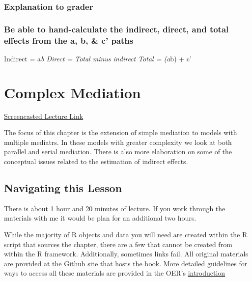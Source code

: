 \documentclass[
  11pt,
]{book}
\begin{document}
\hypertarget{explanation-to-grader}{%
\subsection*{Explanation to grader}\label{explanation-to-grader}}


\hypertarget{be-able-to-hand-calculate-the-indirect-direct-and-total-effects-from-the-a-b-c-paths}{%
\subsection*{Be able to hand-calculate the indirect, direct, and total effects from the a, b, \& c' paths}\label{be-able-to-hand-calculate-the-indirect-direct-and-total-effects-from-the-a-b-c-paths}}


Indirect = a\emph{b Direct = Total minus indirect Total = (a}b) + c'

\hypertarget{CompMed}{%
\chapter{Complex Mediation}\label{CompMed}}

\href{https://spu.hosted.panopto.com/Panopto/Pages/Viewer.aspx?pid=6991fd3d-22b6-44f5-ab5b-ad1000314b7f}{Screencasted Lecture Link}

The focus of this chapter is the extension of simple mediation to models with multiple mediatrs. In these models with greater complexity we look at both parallel and serial mediation. There is also more elaboration on some of the conceptual issues related to the estimation of indirect effects.

\hypertarget{navigating-this-lesson-5}{%
\section{Navigating this Lesson}\label{navigating-this-lesson-5}}

There is about 1 hour and 20 minutes of lecture. If you work through the materials with me it would be plan for an additional two hours.

While the majority of R objects and data you will need are created within the R script that sources the chapter, there are a few that cannot be created from within the R framework. Additionally, sometimes links fail. All original materials are provided at the \href{https://https://github.com/lhbikos/ReC_MultivModel}{Github site} that hosts the book. More detailed guidelines for ways to access all these materials are provided in the OER's \protect\hyperlink{ReCintro}{introduction}
\end{document}
